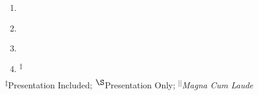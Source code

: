 \begin{center}
\begin{minipage}{0.95\textwidth}
\begin{enumerate}[leftmargin=5mm,itemsep=2mm]
	\item {} \label{useful_prompt}

	\item {} \label{mcnp_efforts}

	\item {} \label{ans_2012_paper}

	\item \textsuperscript{$\ddagger$}   \label{abaqus_2012_paper} 

   \end{enumerate}
\end{minipage}
\end{center}

\footnotesize
\begin{center}
\textsuperscript{$\ddagger$}Presentation Included; \textsuperscript{$\S$}Presentation Only; \textsuperscript{$||$}\textit{Magna Cum Laude}
\end{center}
